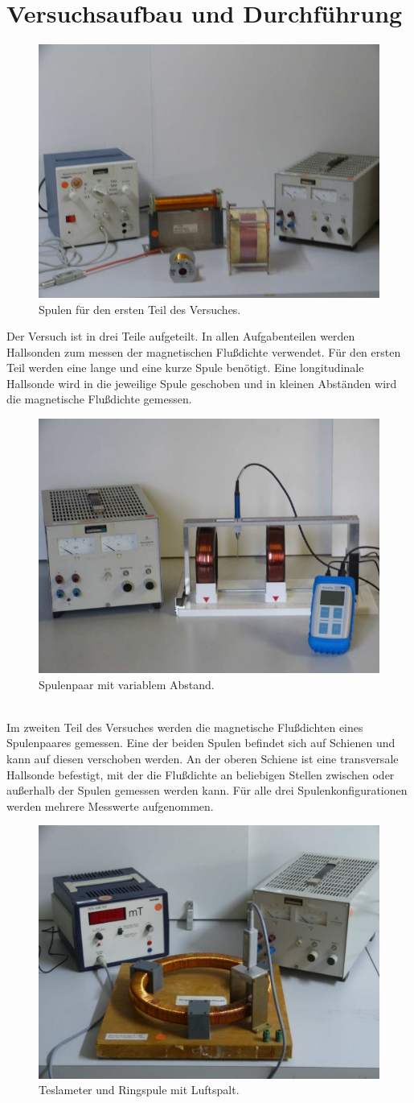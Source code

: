 \section{Versuchsaufbau und Durchführung}
\label{sec:Durchführung}

\begin{figure}[h!]
        \centering
        \includegraphics[width=0.3\linewidth]{fotos/spulen.png}
        \caption{Spulen für den ersten Teil des Versuches.\cite{V308}}
        \label{fig:spulen}
\end{figure}
Der Versuch ist in drei Teile aufgeteilt. In allen Aufgabenteilen werden Hallsonden zum messen der magnetischen Flußdichte verwendet.
Für den ersten Teil werden eine lange und eine kurze Spule benötigt. Eine longitudinale Hallsonde wird in die jeweilige Spule geschoben 
und in kleinen Abständen wird die magnetische Flußdichte gemessen.
\\
\begin{figure}[h!]
    \centering
    \includegraphics[width=0.3\linewidth]{fotos/helmholtz.png}
    \caption{Spulenpaar mit variablem Abstand.\cite{V308}}
    \label{fig:helmholtz}
\end{figure}
\\
Im zweiten Teil des Versuches werden die magnetische Flußdichten eines Spulenpaares gemessen. Eine der beiden Spulen befindet sich auf Schienen 
und kann auf diesen verschoben werden. An der oberen Schiene ist eine transversale Hallsonde befestigt, mit der die Flußdichte an beliebigen 
Stellen zwischen oder außerhalb der Spulen gemessen werden kann. Für alle drei Spulenkonfigurationen werden mehrere Messwerte aufgenommen.
\\
\begin{figure}
    \centering
    \includegraphics[width=0.3\linewidth]{fotos/hysterese.png}
    \caption{Teslameter und Ringspule mit Luftspalt.\cite{V308}}
    \label{fig:ringspule}
\end{figure}
